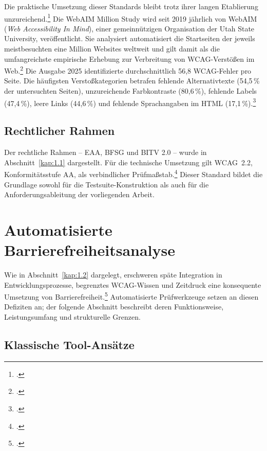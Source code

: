 Die praktische Umsetzung dieser Standards bleibt trotz ihrer langen Etablierung unzureichend.\footcite[Vgl.][S. 297]{bassi_assessment_2025} Die WebAIM Million Study wird seit 2019 jährlich von WebAIM (\textit{Web Accessibility In Mind}), einer gemeinnützigen Organisation der Utah State University, veröffentlicht. Sie analysiert auto\-matisiert die Startseiten der jeweils meistbesuchten eine Million Websites weltweit und gilt damit als die umfangreichste empirische Erhebung zur Verbreitung von \ac{WCAG}-Verstößen im Web.\footcite[Vgl.][]{WebAIM} Die Ausgabe 2025 identifizierte durchschnittlich 56,8 \ac{WCAG}-Fehler pro Seite. Die häufigsten Verstoßkategorien betrafen fehlende Alternativtexte (54{,}5\,\% der untersuchten Seiten), unzureichende Farbkontraste (80{,}6\,\%), fehlende Labels (47{,}4\,\%), leere Links (44{,}6\,\%) und fehlende Sprachangaben im \acs{HTML} (17{,}1\,\%).\footcite[Vgl.][]{WebAIM}

\subsection{Rechtlicher Rahmen}

Der rechtliche Rahmen -- \ac{EAA}, \ac{BFSG} und \ac{BITV} 2.0 -- wurde in Abschnitt~\ref{kap:1.1} dargestellt. Für die technische Umsetzung gilt \ac{WCAG}~2.2, Konformitätsstufe AA, als verbindlicher Prüfmaßstab.\footcites[Vgl.][]{WCAG, BITV, BFSG}[][S. 475]{heinemann_barrierefreiheit_2024} Dieser Standard bildet die Grundlage sowohl für die Testsuite-Konstruktion als auch für die Anforderungsableitung der vorliegenden Arbeit.


\section{Automatisierte Barrierefreiheitsanalyse} \label{kap:2.2}

Wie in Abschnitt~\ref{kap:1.2} dargelegt, erschweren späte Integration in Entwicklungsprozesse, begrenztes WCAG-Wissen und Zeitdruck eine konsequente Umsetzung von Barrierefreiheit.\footcites[Vgl.][S. 298]{bassi_assessment_2025}[][S. 123]{mowar_accessibility_2024} Automatisierte Prüfwerkzeuge setzen an diesen Defiziten an; der folgende Abschnitt beschreibt deren Funktionsweise, Leistungsumfang und strukturelle Grenzen.

\subsection{Klassische Tool-Ansätze} \label{tools}

